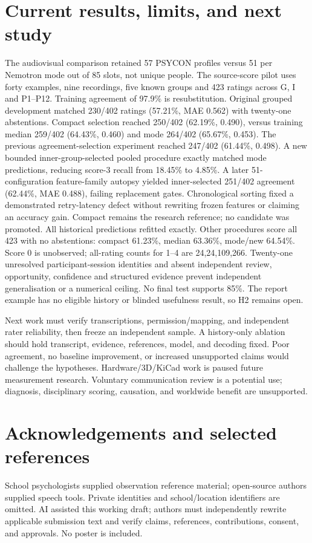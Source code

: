 \documentclass{article}
\begin{document}
\section{Current results, limits, and next study}
The audiovisual comparison retained 57 PSYCON profiles versus 51 per Nemotron mode out of 85 slots, not unique people. The source-score pilot uses forty examples, nine recordings, five known groups and 423 ratings across G, I and P1--P12. Training agreement of 97.9\% is resubstitution. Original grouped development matched 230/402 ratings (57.21\%, MAE 0.562) with twenty-one abstentions. Compact selection reached 250/402 (62.19\%, 0.490), versus training median 259/402 (64.43\%, 0.460) and mode 264/402 (65.67\%, 0.453). The previous agreement-selection experiment reached 247/402 (61.44\%, 0.498). A new bounded inner-group-selected pooled procedure exactly matched mode predictions, reducing score-3 recall from 18.45\% to 4.85\%. A later 51-configuration feature-family autopsy yielded inner-selected 251/402 agreement (62.44\%, MAE 0.488), failing replacement gates. Chronological sorting fixed a demonstrated retry-latency defect without rewriting frozen features or claiming an accuracy gain. Compact remains the research reference; no candidate was promoted. All historical predictions refitted exactly. Other procedures score all 423 with no abstentions: compact 61.23\%, median 63.36\%, mode/new 64.54\%. Score 0 is unobserved; all-rating counts for 1--4 are 24,24,109,266. Twenty-one unresolved participant-session identities and absent independent review, opportunity, confidence and structured evidence prevent independent generalisation or a numerical ceiling. No final test supports 85\%. The report example has no eligible history or blinded usefulness result, so H2 remains open.

Next work must verify transcriptions, permission/mapping, and independent rater reliability, then freeze an independent sample. A history-only ablation should hold transcript, evidence, references, model, and decoding fixed. Poor agreement, no baseline improvement, or increased unsupported claims would challenge the hypotheses. Hardware/3D/KiCad work is paused future measurement research. Voluntary communication review is a potential use; diagnosis, disciplinary scoring, causation, and worldwide benefit are unsupported.

\section{Acknowledgements and selected references}
School psychologists supplied observation reference material; open-source authors supplied speech tools. Private identities and school/location identifiers are omitted. AI assisted this working draft; authors must independently rewrite applicable submission text and verify claims, references, contributions, consent, and approvals. No poster is included.
\end{document}
